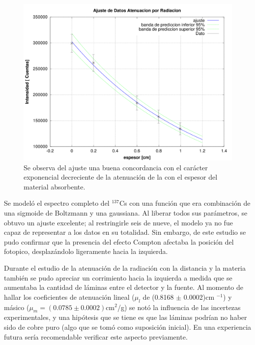 \documentclass[twoside]{article}
\begin{document}
\begin{multicols}{2}
\begin{figure}[H]
    \centering
    \includegraphics[scale=0.35]{Ajuste_Curva_Coeficiente_de_Atenuacion_Lineal.png}
    \caption{Se observa del ajuste una buena concordancia con el carácter exponencial decreciente de la atenuación de la  con el espesor del material absorbente.}
    \label{ajuste_atenuacion}
\end{figure}

Se modeló el espectro completo del $^{137}$Cs con una función que era combinación de una sigmoide de Boltzmann y una gaussiana. Al liberar todos sus parámetros, se obtuvo un ajuste excelente; al restringirle seis de nueve, el modelo ya no fue capaz de representar a los datos en su totalidad. Sin embargo, de este estudio se pudo confirmar que la presencia del efecto Compton afectaba la posición del fotopico, desplazándolo ligeramente hacia la izquierda.

Durante el estudio de la atenuación de la radiación con la distancia y la materia también se pudo apreciar un corrimiento hacia la izquierda a medida que se aumentaba la cantidad de láminas entre el detector y la fuente. Al momento de hallar los coeficientes de atenuación lineal (${\mu_l}$ de (0.8168 ${\pm}$ 0.0002)cm ${^{-1}}$) y másico ($\mu_m = (0.0785 \pm 0.0002)$cm$^2$/g) se notó la influencia de las incertezas experimentales, y una hipótesis que se tiene es que las láminas podrían no haber sido de cobre puro (algo que se tomó como suposición inicial). En una experiencia futura sería recomendable verificar este aspecto previamente.

\begin{thebibliography}{90}


\end{thebibliography}
\end{multicols}
\end{document}

